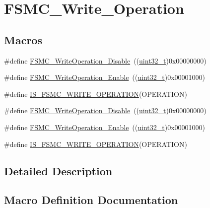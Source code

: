 \hypertarget{group___f_s_m_c___write___operation}{}\section{F\+S\+M\+C\+\_\+\+Write\+\_\+\+Operation}
\label{group___f_s_m_c___write___operation}
\subsection*{Macros}
\begin{DoxyCompactItemize}
\item 
\#define \hyperlink{group___f_s_m_c___write___operation_ga74176320484248f06abae854170f9d9f}{F\+S\+M\+C\+\_\+\+Write\+Operation\+\_\+\+Disable}~((\hyperlink{_p_e___types_8h_a33594304e786b158f3fb30289278f5af}{uint32\+\_\+t})0x00000000)
\item 
\#define \hyperlink{group___f_s_m_c___write___operation_ga2478beb6dd8861b34a16b8a57a795e56}{F\+S\+M\+C\+\_\+\+Write\+Operation\+\_\+\+Enable}~((\hyperlink{_p_e___types_8h_a33594304e786b158f3fb30289278f5af}{uint32\+\_\+t})0x00001000)
\item 
\#define \hyperlink{group___f_s_m_c___write___operation_ga87fc20d11761caa66c3e7d77a3a7d3e3}{I\+S\+\_\+\+F\+S\+M\+C\+\_\+\+W\+R\+I\+T\+E\+\_\+\+O\+P\+E\+R\+A\+T\+I\+ON}(O\+P\+E\+R\+A\+T\+I\+ON)
\item 
\#define \hyperlink{group___f_s_m_c___write___operation_ga74176320484248f06abae854170f9d9f}{F\+S\+M\+C\+\_\+\+Write\+Operation\+\_\+\+Disable}~((\hyperlink{_p_e___types_8h_a33594304e786b158f3fb30289278f5af}{uint32\+\_\+t})0x00000000)
\item 
\#define \hyperlink{group___f_s_m_c___write___operation_ga2478beb6dd8861b34a16b8a57a795e56}{F\+S\+M\+C\+\_\+\+Write\+Operation\+\_\+\+Enable}~((\hyperlink{_p_e___types_8h_a33594304e786b158f3fb30289278f5af}{uint32\+\_\+t})0x00001000)
\item 
\#define \hyperlink{group___f_s_m_c___write___operation_ga87fc20d11761caa66c3e7d77a3a7d3e3}{I\+S\+\_\+\+F\+S\+M\+C\+\_\+\+W\+R\+I\+T\+E\+\_\+\+O\+P\+E\+R\+A\+T\+I\+ON}(O\+P\+E\+R\+A\+T\+I\+ON)
\end{DoxyCompactItemize}


\subsection{Detailed Description}


\subsection{Macro Definition Documentation}
